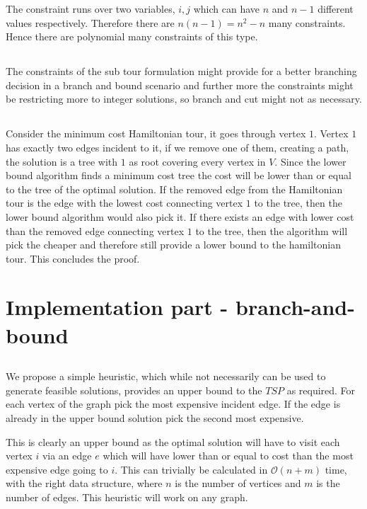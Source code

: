 The constraint runs over two variables, $i,j$ which can have $n$ and $n-1$ different values respectively. Therefore there are $n(n-1) = n^2-n$ many constraints. Hence there are polynomial many constraints of this type.

\subsection{} %
The constraints of the sub tour formulation might provide for a better branching decision in a branch and bound scenario and further more the constraints might be restricting more to integer solutions, so branch and cut might not as necessary. 

\subsection{} %
Consider the minimum cost Hamiltonian tour, it goes through vertex $1$. Vertex $1$ has exactly two edges incident to it, if we remove one of them, creating a path, the solution is a tree with $1$ as root covering every vertex in $V$. Since the lower bound algorithm finds a minimum cost tree the cost will be lower than or equal to the tree of the optimal solution. If the removed edge from the Hamiltonian tour is the edge with the lowest cost connecting vertex $1$ to the tree, then the lower bound algorithm would also pick it. If there exists an edge with lower cost than the removed edge connecting vertex $1$ to the tree, then the algorithm will pick the cheaper and therefore still  provide a lower bound to the hamiltonian tour. This concludes the proof. 

\section{Implementation part - branch-and-bound}
\subsection{}
We propose a simple heuristic, which while not necessarily can be used to generate feasible solutions, provides an upper bound to the $TSP$ as required. For each vertex of the graph pick the most expensive incident edge. If the edge is already in the upper bound solution pick the second most expensive. 

This is clearly an upper bound as the optimal solution will have to visit each vertex $i$ via an edge $e$ which will have lower than or equal to cost than the most expensive edge going to $i$. This can trivially be calculated in $\mathcal{O}(n+m)$ time, with the right data structure, where $n$ is the number of vertices and $m$ is the number of edges. This heuristic will work on any graph.

